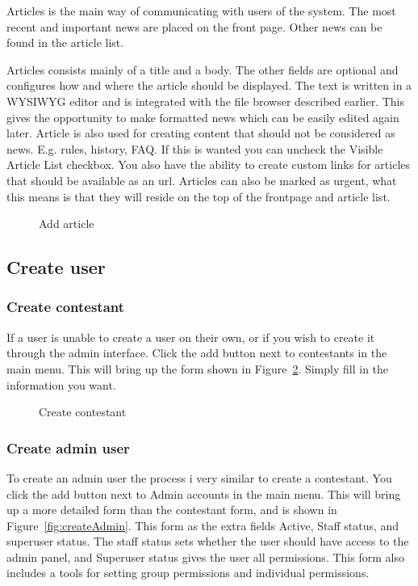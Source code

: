 Articles is the main way of communicating with users of the system. The
most recent and important news are placed on the front page. Other news
can be found in the article list.

Articles consists mainly of a title and a body. The other fields are
optional and configures how and where the article should be displayed.
The text is written in a WYSIWYG editor and is integrated with the file
browser described earlier. This gives the opportunity to make formatted
news which can be easily edited again later. Article is also used for
creating content that should not be considered as news. E.g. rules,
history, FAQ. If this is wanted you can uncheck the Visible Article
List checkbox. You also have the ability to create custom links for
articles that should be available as an url. Articles can also be
marked as urgent, what this means is that they will reside on the top
of the frontpage and article list.

\begin{figure}
\centering
	\caption{Add article}
	\label{fig:article}
\end{figure}

\subsection{Create user}

\subsubsection{Create contestant}

If a user is unable to create a user on their own, or if you wish to
create it through the admin interface. Click the add button next to
contestants in the main menu. This will bring up the form shown in
Figure~\ref{fig:createContestant}. Simply fill in the information you want.

\begin{figure}
\centering
	\caption{Create contestant}
	\label{fig:createContestant}
\end{figure}


\subsubsection{Create admin user}

To create an admin user the process i very similar to create a
contestant. You click the add button next to Admin accounts in the main
menu. This will bring up a more detailed form than the contestant form,
and is shown in Figure~\ref{fig:createAdmin}. This form as the extra fields Active,
Staff status, and superuser status. The staff status sets whether the
user should have access to the admin panel, and Superuser status gives
the user all permissions. This form also includes a tools for setting
group permissions and individual permissions. 

